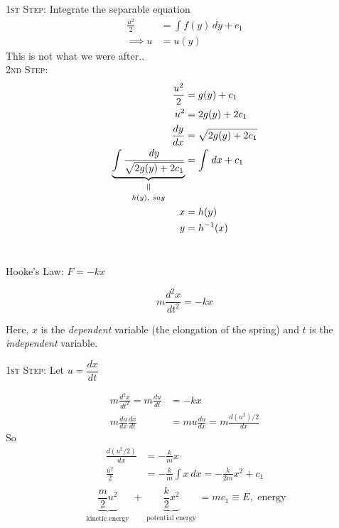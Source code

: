 \documentclass[10pt]{scrartcl}
\begin{document}
\begin{enumerate}[(1)]
\textsc{1st Step:} Integrate the separable equation\[
\begin{aligned}
  \frac{u^2}{2} &= \int f(y)\,dy + c_1\\
  \implies u &= u(y)
\end{aligned}
\]
This is not what we were after..\\

\textsc{2nd Step:}
\[
\begin{aligned}
  \frac{u^2}{2} &= g(y) + c_1\\
  u^2 &= 2g(y) + 2c_1\\
  \frac{dy}{dx} &= \sqrt{2g(y) + 2c_1}\\
  \equalto{\underbrace{\int \frac{dy}{\sqrt{2g(y)+2c_1}}}}{h(y),\ say} &= \int \,dx + c_1\\
  x &= h(y)\\
  y &= h^{-1}(x)
\end{aligned}
\]~\\

\begin{example}
	Hooke's Law: $F = -kx$
	
	\[m\frac{d^2x}{dt^2} = -kx\]

\begin{note}
  Here, $x$ is the \emph{dependent} variable (the elongation of the spring) and $t$ is the \emph{independent} variable.
\end{note}
	
\textsc{1st Step:}
Let $u = \dfrac{dx}{dt}$

\[
\begin{aligned}
  m\frac{d^2x}{dt^2} = m\frac{du}{dt} &= -kx\\
  m\frac{du}{dx}\frac{dx}{dt} &= mu\frac{du}{dx} = m\frac{d(u^2)/2}{dx}
\end{aligned}
\]
So
\[
\begin{aligned}
  \frac{d(u^2/2)}{dx} &= -\frac{k}{m}x\\
  \frac{u^2}{2} &= -\frac{k}{m}\int x\,dx = -\frac{k}{2m}x^2 + c_1\\
\end{aligned}
\]
\[\underbrace{\frac{m}{2}u^2}_{\substack{\text{kinetic energy}}} + \underbrace{\frac{k}{2}x^2}_{\substack{\text{potential energy}}} = mc_1 \equiv E, \text{ energy}\]


\end{example}
\end{enumerate}
\end{document}

